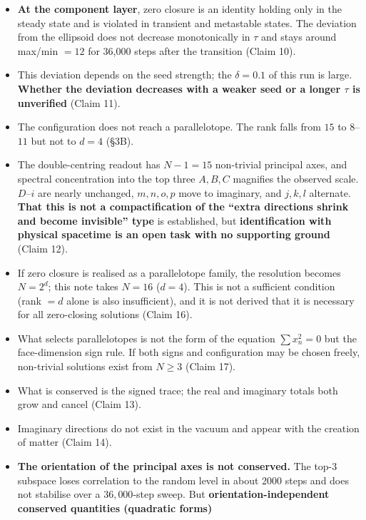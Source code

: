 \documentclass[
  10pt,
]{article}
\providecommand{\tightlist}{%
  \setlength{\itemsep}{0pt}\setlength{\parskip}{0pt}}
\begin{document}
\begin{itemize}
\tightlist
\item
  \textbf{At the component layer}, zero closure is an identity holding
  only in the steady state and is violated in transient and metastable
  states. The deviation from the ellipsoid does not decrease
  monotonically in \(\tau\) and stays around max/min \(=12\) for 36,000
  steps after the transition (Claim 10).
\item
  This deviation depends on the seed strength; the \(\delta=0.1\) of
  this run is large. \textbf{Whether the deviation decreases with a
  weaker seed or a longer \(\tau\) is unverified} (Claim 11).
\item
  The configuration does not reach a parallelotope. The rank falls from
  \(15\) to \(8\)--\(11\) but not to \(d=4\) (§3B).
\item
  The double-centring readout has \(N-1=15\) non-trivial principal axes,
  and spectral concentration into the top three \(A,B,C\) magnifies the
  observed scale. \(D\)--\(i\) are nearly unchanged, \(m,n,o,p\) move to
  imaginary, and \(j,k,l\) alternate. \textbf{That this is not a
  compactification of the ``extra directions shrink and become
  invisible'' type} is established, but \textbf{identification with
  physical spacetime is an open task with no supporting ground} (Claim
  12).
\item
  If zero closure is realised as a parallelotope family, the resolution
  becomes \(N=2^d\); this note takes \(N=16\) (\(d=4\)). This is not a
  sufficient condition (rank \(=d\) alone is also insufficient), and it
  is not derived that it is necessary for all zero-closing solutions
  (Claim 16).
\item
  What selects parallelotopes is not the form of the equation
  \(\sum x_n^2=0\) but the face-dimension sign rule. If both signs and
  configuration may be chosen freely, non-trivial solutions exist from
  \(N\ge3\) (Claim 17).
\item
  What is conserved is the signed trace; the real and imaginary totals
  both grow and cancel (Claim 13).
\item
  Imaginary directions do not exist in the vacuum and appear with the
  creation of matter (Claim 14).
\item
  \textbf{The orientation of the principal axes is not conserved.} The
  top-3 subspace loses correlation to the random level in about 2000
  steps and does not stabilise over a \(36{,}000\)-step sweep. But
  \textbf{orientation-independent conserved quantities (quadratic forms)
}
\end{itemize}
\end{document}

